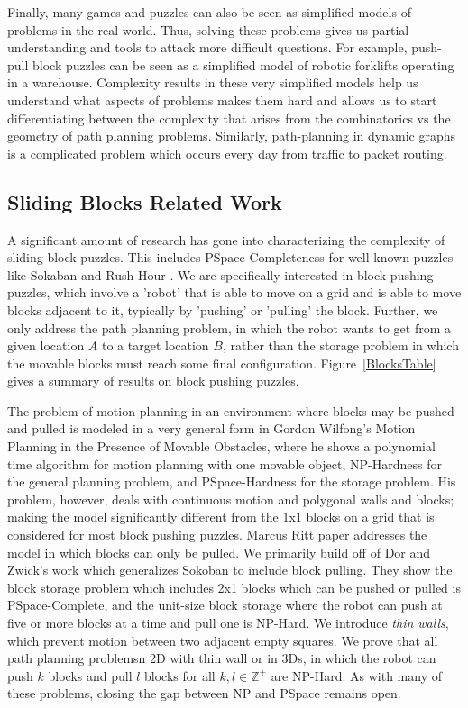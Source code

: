 \documentclass[11pt]{article}
\begin{document}
Finally, many games and puzzles can also be seen as simplified models of problems in the real world. Thus, solving these problems gives us partial understanding and tools to attack more difficult questions. For example, push-pull block puzzles can be seen as a simplified model of robotic forklifts operating in a warehouse. Complexity results in these very simplified models help us understand what aspects of problems makes them hard and allows us to start differentiating between the complexity that arises from the combinatorics vs the geometry of path planning problems. Similarly, path-planning in dynamic graphs is a complicated problem which occurs every day from traffic to packet routing.




\subsection{Sliding Blocks Related Work}

A significant amount of research has gone into characterizing the complexity of sliding block puzzles. This includes PSpace-Completeness for well known puzzles like Sokaban \cite{Sokoban98} and Rush Hour \cite{RushHour02}. We are specifically interested in block pushing puzzles, which involve a 'robot' that is able to move on a grid and is able to move blocks adjacent to it, typically by 'pushing' or 'pulling' the block. Further, we only address the path planning problem, in which the robot wants to get from a given location $A$ to a target location $B$, rather than the storage problem in which the movable blocks must reach some final configuration. Figure~\ref{BlocksTable} gives a summary of results on block pushing puzzles. 

The problem of motion planning in an environment where blocks may be pushed and pulled is modeled in a very general form in Gordon Wilfong's Motion Planning in the Presence of Movable Obstacles, where he shows a polynomial time algorithm for motion planning with one movable object, NP-Hardness for the general planning problem, and PSpace-Hardness for the storage problem. \cite{PushPull91} His problem, however, deals with continuous motion and polygonal walls and blocks; making the model significantly different from the 1x1 blocks on a grid that is considered for most block pushing puzzles. Marcus Ritt paper \cite{Pull10} addresses the model in which blocks can only be pulled. We primarily build off of Dor and Zwick's work which generalizes Sokoban to include block pulling. They show the block storage problem which includes 2x1 blocks which can be pushed or pulled is PSpace-Complete, and the unit-size block storage where the robot can push at five or more blocks at a time and pull one is NP-Hard\cite{DZ96}. We introduce \emph{thin walls}, which prevent motion between two adjacent empty squares. We prove that all path planning problemsn 2D with thin wall or in 3Ds, in which the robot can push $k$ blocks and pull $l$ blocks for all $k,l \in \mathbb{Z}^+$ are NP-Hard. As with many of these problems, closing the gap between NP and PSpace remains open.
\end{document}
